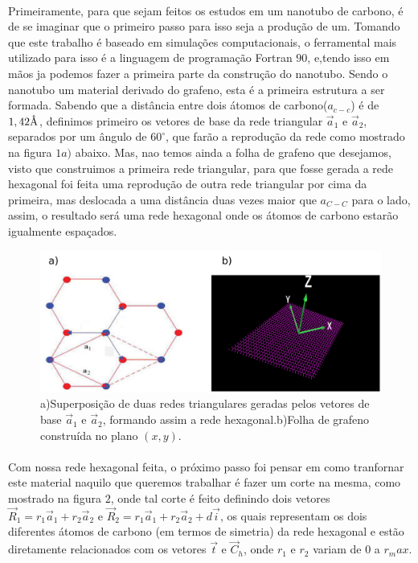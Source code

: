 \documentclass[12pt,a4paper]{report}
\newcommand{\angstrom}{\textup{\AA}}
\begin{document}
\paragraph{}
Primeiramente, para que sejam feitos os estudos em um nanotubo de carbono, é de se imaginar que o primeiro passo para isso seja a produção de um. Tomando que este trabalho é baseado em simulações computacionais, o ferramental mais utilizado para isso é a linguagem de programação Fortran $90$, e,tendo isso em mãos ja podemos fazer a primeira parte da construção do nanotubo. Sendo o nanotubo um material derivado do grafeno, esta é a primeira estrutura a ser formada. Sabendo que a distância entre dois átomos de carbono($a_{c-c}$) é de $1,42 \angstrom$, definimos primeiro os vetores de base da rede triangular $\vec{a}_1$ e $\vec{a}_2$, separados por um ângulo de $60^{\circ}$, que farão a reprodução da rede como mostrado na figura $1a)$ abaixo. Mas, nao temos ainda a folha de grafeno que desejamos, visto que construimos a primeira rede triangular, para que fosse gerada a rede hexagonal foi feita uma reprodução de outra rede triangular por cima da primeira, mas deslocada a uma distância duas vezes maior que $a_{C-C}$ para o lado, assim, o resultado será uma rede hexagonal onde os átomos de carbono estarão igualmente espaçados.

\begin{figure} [!h]
\centering
\includegraphics[scale=0.14]{print1.png}
\caption{a)Superposição de duas redes triangulares geradas pelos vetores de base $\vec{a}_1$ e $\vec{a}_2$, formando assim a rede hexagonal.b)Folha de grafeno construída no plano $(x,y)$.}
\end{figure}

\paragraph{}
Com nossa rede hexagonal feita, o próximo passo foi pensar em como tranfornar este material naquilo que queremos trabalhar é fazer um corte na mesma, como mostrado na figura $2$, onde tal corte é feito definindo dois vetores $\vec{R}_1=r_1\vec{a}_1+r_2\vec{a}_2$ e $\vec{R}_2=r_1\vec{a}_1+r_2\vec{a}_2+d\vec{i}$, os quais representam os dois diferentes átomos de carbono (em termos de simetria) da rede hexagonal e estão diretamente relacionados com os vetores $\vec{t}$ e $\vec{C}_h$, onde $r_1$ e $r_2$ variam de $0$ a $r_max$.
\end{document}
